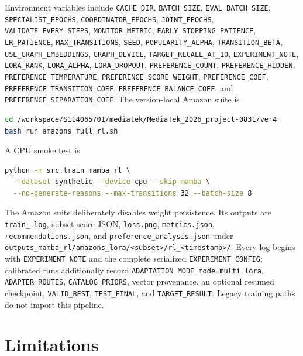 \documentclass[11pt,a4paper]{article}
\begin{document}
Environment variables include \texttt{CACHE\_DIR},
\texttt{BATCH\_SIZE}, \texttt{EVAL\_BATCH\_SIZE},
\texttt{SPECIALIST\_EPOCHS}, \texttt{COORDINATOR\_EPOCHS},
\texttt{JOINT\_EPOCHS}, \texttt{VALIDATE\_EVERY\_STEPS},
\texttt{MONITOR\_METRIC}, \texttt{EARLY\_STOPPING\_PATIENCE},
\texttt{LR\_PATIENCE}, \texttt{MAX\_TRANSITIONS}, \texttt{SEED},
\texttt{POPULARITY\_ALPHA}, \texttt{TRANSITION\_BETA},
\texttt{USE\_GRAPH\_EMBEDDINGS}, \texttt{GRAPH\_DEVICE},
\texttt{TARGET\_RECALL\_AT\_10}, \texttt{EXPERIMENT\_NOTE},
\texttt{LORA\_RANK}, \texttt{LORA\_ALPHA}, \texttt{LORA\_DROPOUT},
\texttt{PREFERENCE\_COUNT}, \texttt{PREFERENCE\_HIDDEN},
\texttt{PREFERENCE\_TEMPERATURE}, \texttt{PREFERENCE\_SCORE\_WEIGHT},
\texttt{PREFERENCE\_COEF}, \texttt{PREFERENCE\_TRANSITION\_COEF},
\texttt{PREFERENCE\_BALANCE\_COEF}, and
\texttt{PREFERENCE\_SEPARATION\_COEF}. The version-local Amazon suite is
\begin{lstlisting}[language=bash]
cd /workspace/S114065701/mediatek/MediaTek_2026_project-0831/ver4
bash run_amazons_full_rl.sh
\end{lstlisting}
A CPU smoke test is
\begin{lstlisting}[language=bash]
python -m src.train_mamba_rl \
  --dataset synthetic --device cpu --skip-mamba \
  --no-generate-reasons --max-transitions 32 --batch-size 8
\end{lstlisting}

The Amazon suite deliberately disables weight persistence. Its outputs are
\texttt{train\_<run-id>.log}, subset score JSON, \texttt{loss.png},
\texttt{metrics.json}, \texttt{recommendations.json}, and
\texttt{preference\_analysis.json} under
\texttt{outputs\_mamba\_rl/amazons\_lora/<subset>/rl\_<timestamp>/}. Every log begins with
\texttt{EXPERIMENT\_NOTE} and the complete serialized
\texttt{EXPERIMENT\_CONFIG}; calibrated runs additionally record
\texttt{ADAPTATION\_MODE mode=multi\_lora}, \texttt{ADAPTER\_ROUTES},
\texttt{CATALOG\_PRIORS}, vector provenance, an optional resumed checkpoint,
\texttt{VALID\_BEST}, \texttt{TEST\_FINAL}, and
\texttt{TARGET\_RESULT}. Legacy training paths do not import this pipeline.

\section{Limitations}
\end{document}
